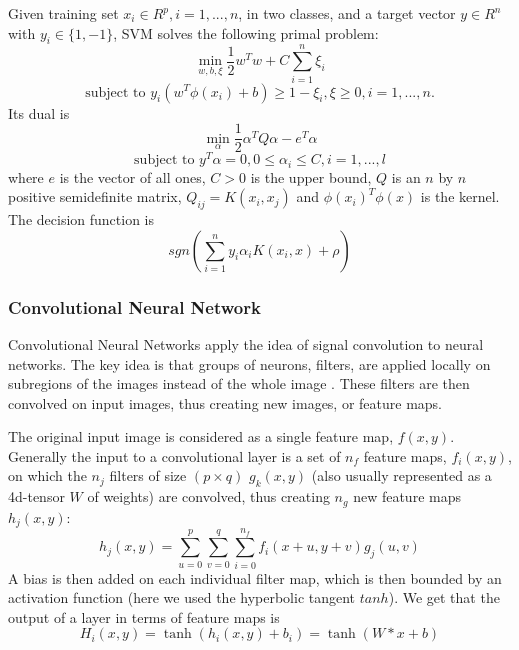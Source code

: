\documentclass{acm_proc_article-sp}
\begin{document}
Given training set $x_i\in R^p,i=1,...,n$, in two classes, and a target vector $y\in R^n$ with $y_i\in \{1,-1\}$, SVM solves the following primal problem:
\begin{equation}
\min_{w,b,\xi} \frac12 w^T w + C \sum_{i=1}^n \xi_i \label{eq:lsvm1}
\end{equation}
\[
\mbox{subject to } y_i (w^T \phi(x_i)+b)\geq 1-\xi_i,
\xi\geq 0, i=1,...,n.
\]
Its dual is
\begin{equation}
\min_{\alpha}\frac12 \alpha^T Q\alpha - e^T\alpha \label{eq:lsvm2}
\end{equation}
\[
\mbox{subject to } y^T\alpha = 0, 0\leq \alpha_i\leq C,i=1,...,l
\]
where $e$ is the vector of all ones, $C>0$ is the upper bound, $Q$ is an $n$ by $n$ positive semidefinite matrix, $Q_{ij}=K(x_i,x_j)$ and $\phi(x_i)^T\phi(x)$ is the kernel. The decision function is 
\begin{equation}
sgn(\sum_{i=1}^n y_i\alpha_i K(x_i,x)+\rho) \label{eq:lsvm3}
\end{equation}


\subsubsection{Convolutional Neural Network}
Convolutional Neural Networks apply the idea of signal convolution to neural networks. The key idea is that groups of neurons, filters, are applied locally on subregions of the images instead of the whole image \cite{726791}. These filters are then convolved on input images, thus creating new images, or feature maps.

The original input image is considered as a single feature map, $f(x,y)$. Generally the input to a convolutional layer is a set of $n_f$ feature maps, $f_i(x,y)$, on which the $n_j$ filters of size $(p\times q)$ $g_k(x,y)$ (also usually represented as a 4d-tensor $W$ of weights) are convolved, thus creating $n_g$ new feature maps $h_j(x,y)$:
\begin{equation}
 h_j(x,y) = \sum_{u=0}^p\sum_{v=0}^q\sum_{i=0}^{n_f} f_i(x+u,y+v)g_j(u,v)  \label{eq:cnn1}
 \end{equation}
A bias is then added on each individual filter map, which is then bounded by an activation function (here we used the hyperbolic tangent $tanh$). We get that the output of a layer in terms of feature maps is 
\begin{equation}
H_i(x,y) = \tanh(h_i(x,y) + b_i) = \tanh(W\ast x + b) \label{eq:cnn2}
\end{equation}
\end{document}
